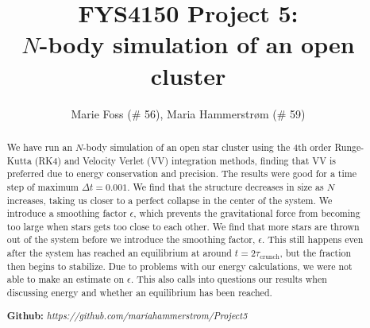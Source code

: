\documentclass{article}
\title{\textbf{FYS4150 Project 5: \\$N$-body simulation of an open cluster}}
\author{Marie Foss (\# 56), Maria Hammerstr{{\o}}m (\# 59)}
\date{}
\begin{document}
\maketitle

\begin{abstract}
	\noindent We have run an $N$-body simulation of an open star cluster using the 4th order Runge-Kutta (RK4) and Velocity Verlet (VV) integration methods, finding that VV is preferred due to energy conservation and precision. The results were good for a time step of maximum $\Delta t = 0.001$. We find that the structure decreases in size as $N$ increases, taking us closer to a perfect collapse in the center of the system. We introduce a smoothing factor $\epsilon$, which prevents the gravitational force from becoming too large when stars gets too close to each other. We find that more stars are thrown out of the system before we introduce the smoothing factor, $\epsilon$. This still happens even after the system has reached an equilibrium at around $t = 2 \tau_{\mathrm{crunch}}$, but the fraction then begins to stabilize. Due to problems with our energy calculations, we were not able to make an estimate on $\epsilon$. This also calls into questions our results when discussing energy and whether an equilibrium has been reached.
	\vspace*{2ex}
	
	\noindent \textbf{Github:} \textit{https://github.com/mariahammerstrom/Project5}
	\vspace*{2ex}
\end{abstract}
\end{document}
